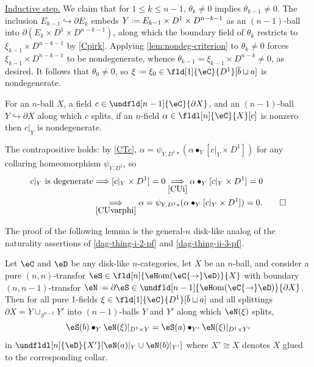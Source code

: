 \documentclass[12pt,reqno]{amsart}
\newcounter{alpha}\renewcommand\thealpha{\upshape\Alph{alpha}}
\newcommand{\eHom}{{\eH}\mathrm{om}}
\newcommand{\C}{\eC}
\newcommand{\D}{\eD}
\newcommand{\blt}{\bullet}
\newcommand{\fcj}[1]{\overline{#1}}
\newcommand{\itemstep}[1]{\smallskip\noindent\underline{#1}}
\renewcommand{\amalg}{\sqcup}
\DeclareRobustCommand{\coloneq}{\mathrel{\vcenter{\baselineskip0.5ex\lineskiplimit0pt\hbox{\scriptsize{\upshape.}}\hbox{\scriptsize{\upshape.}}}}=}
\DeclareRobustCommand{\coloneqq}{\coloneq}
\begin{document}
\begin{pf}
\itemstep{Inductive step.}
We claim that for $1\leq k\leq n-1$, $\theta_k\neq 0$ implies $\theta_{k-1}\neq 0$. The inclusion $E_{k-1}\hookrightarrow\partial E_k$ embeds $Y\coloneqq E_{k-1}\times D^1\times D^{n-k-1}$ as an $(n-1)$-ball into $\partial(E_k\times D^1\times D^{n-k-1})$, along which the boundary field of $\theta_k$ restricts to $\xi_{k-1}\times D^{n-k-1}$ by \ref{Cpirk}. Applying \cref{lem:nondeg-criterion} to $\theta_k\neq 0$ forces $\xi_{k-1}\times D^{n-k-1}$ to be nondegenerate, whence $\theta_{k-1} = \xi_{k-1}\times D^{n-k}\neq 0$, as desired. It follows that $\theta_0\neq 0$, so $\xi\coloneq\xi_0\in\fld[1]{\C}{D^1}[\fcj{b}\amalg a]$ is nondegenerate.
\end{pf}

\begin{lemma}
\label{lem:nondeg-criterion}
For an $n$-ball $X$, a field $c \in \undfld[n-1]{\C}{\partial X}$, and an $(n-1)$-ball $Y \hookrightarrow \partial X$ along which $c$ splits, if an
$n$-field $\alpha \in \fldl[n]{\C}{X}[c]$ is nonzero then $c|_Y$ is nondegenerate.
\end{lemma}

\begin{pf}
The contrapositive holds: by \ref{CTc}, $\alpha = \psi_{Y,D^1*}(\alpha \blt_Y [c|_Y \times D^1])$ for any collaring homeomorphism $\psi_{Y,D^1}$, so
\begin{align*}
c|_Y \text{ is degenerate}
&\Longrightarrow
[c|_Y \times D^1] = 0
\underset{\ref{CUi}}{\Longrightarrow}
\alpha \blt_Y [c|_Y \times D^1] = 0
\\
&\underset{\ref{CUvarphi}}{\Longrightarrow}
\alpha
=
\psi_{Y,D^1*}(\alpha \blt_Y [c|_Y \times D^1])
=
0.\qedhere
\end{align*}
\end{pf}

The proof of the following lemma is the general-$n$ disk-like analog of the naturality assertions of \cref{dag-thing-i-2-pf} and \cref{dag-thing-ii-3-pf}.

\begin{lemma}
	\label{lem:transfor-naturality}
    Let $\C$ and $\D$ be any disk-like $n$-categories, let $X$ be an $n$-ball, and consider a pure $(n,n)$-transfor $\eS\in\fld[n]{\eHom(\C{\to}\D)}{X}$
	with boundary $(n,n-1)$-transfor $\eN\coloneq\partial\eS\in\undfld[n-1]{\eHom(\C{\to}\D)}{\partial X}$. Then for all pure 1-fields $\xi\in\fld[1]{\C}{D^1}[\fcj{b}\amalg a]$ and all splittings
	$\partial X=Y\cup_{S^{n-2}}Y'$ into $(n-1)$-balls $Y$ and $Y'$ along which $\eN(\xi)$ splits,
	\begin{equation}
		\label{eq:transfor-naturality}
		\eS(b)\blt_Y\eN(\xi)|_{D^1\times Y}
		=
		\eS(a)\blt_{Y'}\eN(\xi)|_{D^1\times Y'}
	\end{equation}
	in $\undfldl[n]{\D}{X'}[\eN(a)|_Y\cup\eN(b)|_{Y'}]$ where $X'\cong X$ denotes $X$ glued to the corresponding collar.
\end{lemma}
\end{document}
